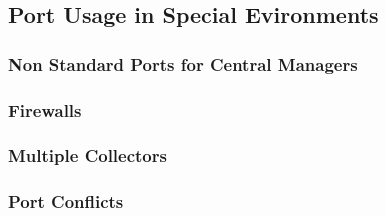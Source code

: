\subsection{\label{sec:Port-Details}Port Usage in Special Evironments }

\Todo

\subsubsection{\label{sec:Ports-NonStandard}Non Standard Ports for Central Managers}

\subsubsection{\label{sec:Ports-Firewalls}Firewalls}

\subsubsection{\label{sec:Ports-MultipleCollectors}Multiple Collectors}

\subsubsection{\label{sec:Ports-Conflicts}Port Conflicts}

